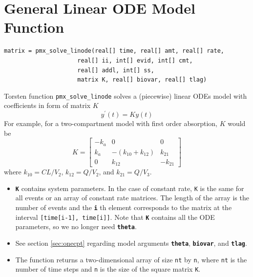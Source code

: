 \documentclass[11pt, reqno, oneside]{amsbook}
\numberwithin{equation}{chapter}
\numberwithin{figure}{chapter}
\numberwithin{table}{chapter}
\theoremstyle{remark}
\begin{document}
\section{General Linear ODE Model Function}
\label{sec:org8ef179a}
\begin{verbatim}
matrix = pmx_solve_linode(real[] time, real[] amt, real[] rate,
                     real[] ii, int[] evid, int[] cmt,
                     real[] addl, int[] ss,
                     matrix K, real[] biovar, real[] tlag)
\end{verbatim}
Torsten function \texttt{pmx\_solve\_linode} 
solves a (piecewise) linear ODEs model with coefficients
in form of matrix \(K\)
\begin{equation}
y^\prime\left(t\right) = Ky\left(t\right)
\end{equation}
For example, for a two-compartment
model with first order absorption, \(K\) would be
\begin{equation}
  K = \left[\begin{array}{ccc}
              -k_a & 0 & 0 \\
              k_a & -\left(k_{10} + k_{12}\right) & k_{21} \\
              0 & k_{12} & -k_{21}
            \end{array}\right]
\end{equation}
where \(k_{10}=CL/V_2\), \(k_{12}=Q/V_2\), and \(k_{21}=Q/V_3\).

\begin{itemize}
\item {\small \color{MRGGreen} \texttt{\textbf{K}}} contains system parameters. In the case of constant rate,
\texttt{K} is the same for all events or an array of constant rate
matrices. The length of the array is
the number of events and the {\small \color{MRGGreen} \texttt{\textbf{i}}} th element corresponds to the matrix at
the interval \texttt{[time[i-1], time[i]]}.
Note that {\small \color{MRGGreen} \texttt{\textbf{K}}} contains all the ODE parameters, so we no
longer need {\small \color{MRGGreen} \texttt{\textbf{theta}}}.
\item See section \ref{sec:onecpt} regarding model arguments {\small \color{MRGGreen} \texttt{\textbf{theta}}},
{\small \color{MRGGreen} \texttt{\textbf{biovar}}}, and {\small \color{MRGGreen} \texttt{\textbf{tlag}}}.
\item The function returns a two-dimensional array of size \texttt{nt}
by \texttt{n}, where \texttt{nt} is the number of time steps and
\texttt{n} is the size of the square matrix \texttt{K}.
\end{itemize}
\end{document}
